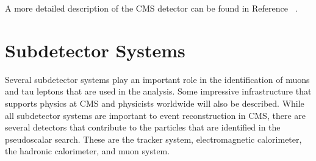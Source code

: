 



A more detailed description of the CMS detector can be found in Reference ~\cite{Chatrchyan:2008zzk}.



\section{Subdetector Systems}
Several subdetector systems play an important role in the identification of muons and tau leptons that are used in the analysis. Some impressive infrastructure that supports physics at CMS and physicists worldwide will also be described. 
While all subdetector systems are important to event reconstruction in CMS, there are several detectors that contribute to the particles that are identified in the pseudoscalar search. These are the tracker system, electromagnetic calorimeter, the hadronic calorimeter, and muon system. 

